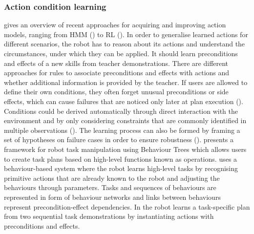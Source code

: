 \subsubsection{Action condition learning}\label{sssec:Action condition learning}
\cite{ingrand2017deliberation} gives an overview of recent approaches for acquiring and improving action models, ranging from HMM (\cite{fox2006robot}) to RL (\cite{sutton1998reinforcement}).
In order to generalise learned actions for different scenarios, the robot has to reason about its actions and understand the circumstances, under which they can be applied. 
It should learn preconditions and effects of a new skills from teacher demonstrations.
There are different approaches for rules to associate preconditions and effects with actions and whether additional information is provided by the teacher.
If users are allowed to define their own conditions, they often forget unusual preconditions or side effects, which can cause failures that are noticed only later at plan execution (\cite{gil1994learning}).
Conditions could be derived automatically through direct interaction with the environment and by only considering constraints that are commonly identified in multiple observations (\cite{ekvall2008robot}).
The learning process can also be formed by framing a set of hypotheses on failure cases in order to ensure robustness (\cite{yildiz2013learning}).
\cite{guerin2015framework} presents a framework for robot task manipulation using Behaviour Trees which allows users to create task plans based on high-level functions known as operations.
\cite{nicolescu2003natural} uses a behaviour-based system where the robot learns high-level tasks by recognising primitive actions that are already known to the robot and adjusting the behaviours through parameters.
Tasks and sequences of behaviours are represented in form of behaviour networks and links between behaviours represent precondition-effect dependencies.
In \cite{veeraraghavan2008teaching} the robot learns a task-specific plan from two sequential task demonstrations by instantiating actions with preconditions and effects.

